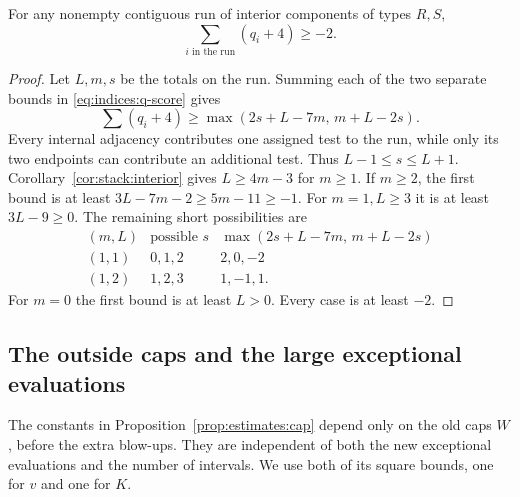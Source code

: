 \begin{lemma}\label{lem:indices:fixed-run}
For any nonempty contiguous run of interior components of types $R,S$,
\begin{equation}\label{eq:indices:fixed-run}
 \sum_{i\text{ in the run}}(q_i+4)\ge-2.
\end{equation}
\end{lemma}
\begin{proof}
Let $L,m,s$ be the totals on the run.  Summing each of the two separate
bounds in \eqref{eq:indices:q-score} gives
\[
 \sum(q_i+4)\ge\max(2s+L-7m,\,m+L-2s).
\]
Every internal adjacency contributes one assigned test to the run, while
only its two endpoints can contribute an additional test.  Thus
$L-1\le s\le L+1$.  Corollary~\ref{cor:stack:interior} gives
$L\ge4m-3$ for $m\ge1$.
If $m\ge2$, the first bound is at least
$3L-7m-2\ge5m-11\ge-1$.  For $m=1,L\ge3$ it is at least $3L-9\ge0$.
The remaining short possibilities are
\[
\begin{array}{c|c|c}
 (m,L)&\text{possible }s&
 \max(2s+L-7m,\,m+L-2s)\\ \hline
 (1,1)&0,1,2&2,0,-2\\
 (1,2)&1,2,3&1,-1,1.
\end{array}
\]
For $m=0$ the first bound is at least $L>0$.  Every case is at least $-2$.
\end{proof}

\subsection{The outside caps and the large exceptional evaluations}

The constants in Proposition~\ref{prop:estimates:cap} depend only on the
old caps $W$, before the extra blow-ups.  They are independent of both the
new exceptional evaluations and the number of intervals.  We use both
of its square bounds, one for $v$ and one for $K$.

